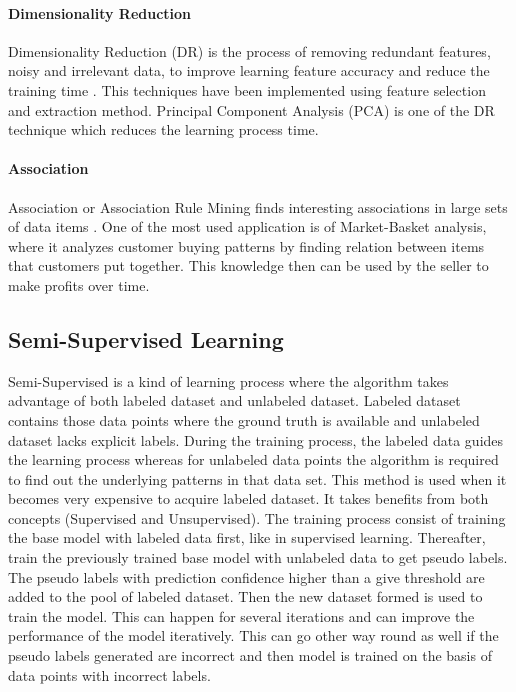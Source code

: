 \documentclass[en,]{template/rrlab}
\begin{document}
\paragraph{Dimensionality Reduction}
Dimensionality Reduction (DR) is the process of removing redundant features, noisy and irrelevant data, to improve learning feature accuracy and reduce the training time \cite{DR}. This techniques have been implemented using feature selection and extraction method. Principal Component Analysis (PCA) is one of the DR technique which reduces the learning process time. 

\paragraph{Association}
Association or Association Rule Mining finds interesting associations in large sets of data items \cite{Cios2007}. One of the most used application is of Market-Basket analysis, where it analyzes customer buying patterns by finding relation between items that customers put together. This knowledge then can be used by the seller to make profits over time.

\subsection{Semi-Supervised Learning}
    Semi-Supervised is a kind of learning process where the algorithm takes advantage of both labeled dataset and unlabeled dataset. Labeled dataset contains those data points where the ground truth is available and unlabeled dataset lacks explicit labels. During the training process, the labeled data guides the learning process whereas for unlabeled data points the algorithm is required to find out the underlying patterns in that data set. This method is used when it becomes very expensive to acquire labeled dataset. It takes benefits from both concepts (Supervised and Unsupervised). The training process consist of training the base model with labeled data first, like in supervised learning. Thereafter, train the previously trained base model with unlabeled data to get pseudo labels. The pseudo labels with prediction confidence higher than a give threshold are added to the pool of labeled dataset. Then the new dataset formed is used to train the model. This can happen for several iterations and can improve the performance of the model iteratively. This can go other way round as well if the pseudo labels generated are incorrect and then model is trained on the basis of data points with incorrect labels.
\end{document}

